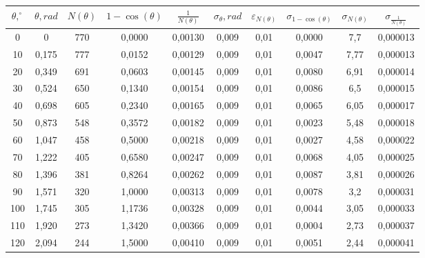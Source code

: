 \documentclass[12pt]{article}
\begin{document}
\begin{center}
    \begin{tabular}{|c|c|c|c|c|c|c|c|c|c|}
      \hline
      $\theta, ^\circ$ & $\theta, rad$ & $N(\theta)$ & $1 - \cos(\theta)$ & $\frac{1}{N(\theta)}$ & $\sigma_\theta, rad$ & $\varepsilon_{N(\theta)}$ & $\sigma_{1 - \cos(\theta)}$ & $\sigma_{N(\theta)}$ & $\sigma_{\frac{1}{N(\theta)}}$ \\
      \hline
      0 & 0 & 770 & 0,0000 & 0,00130 & 0,009 & 0,01 & 0,0000 & 7,7 & 0,000013 \\
      \hline
      10 & 0,175 & 777 & 0,0152 & 0,00129 & 0,009 & 0,01 & 0,0047 & 7,77 & 0,000013 \\
      \hline
      20 & 0,349 & 691 & 0,0603 & 0,00145 & 0,009 & 0,01 & 0,0080 & 6,91 & 0,000014 \\
      \hline
      30 & 0,524 & 650 & 0,1340 & 0,00154 & 0,009 & 0,01 & 0,0086 & 6,5 & 0,000015 \\
      \hline
      40 & 0,698 & 605 & 0,2340 & 0,00165 & 0,009 & 0,01 & 0,0065 & 6,05 & 0,000017 \\
      \hline
      50 & 0,873 & 548 & 0,3572 & 0,00182 & 0,009 & 0,01 & 0,0023 & 5,48 & 0,000018 \\
      \hline
      60 & 1,047 & 458 & 0,5000 & 0,00218 & 0,009 & 0,01 & 0,0027 & 4,58 & 0,000022 \\
      \hline
      70 & 1,222 & 405 & 0,6580 & 0,00247 & 0,009 & 0,01 & 0,0068 & 4,05 & 0,000025 \\
      \hline
      80 & 1,396 & 381 & 0,8264 & 0,00262 & 0,009 & 0,01 & 0,0087 & 3,81 & 0,000026 \\
      \hline
      90 & 1,571 & 320 & 1,0000 & 0,00313 & 0,009 & 0,01 & 0,0078 & 3,2 & 0,000031 \\
      \hline
      100 & 1,745 & 305 & 1,1736 & 0,00328 & 0,009 & 0,01 & 0,0044 & 3,05 & 0,000033 \\
      \hline
      110 & 1,920 & 273 & 1,3420 & 0,00366 & 0,009 & 0,01 & 0,0004 & 2,73 & 0,000037 \\
      \hline
      120 & 2,094 & 244 & 1,5000 & 0,00410 & 0,009 & 0,01 & 0,0051 & 2,44 & 0,000041 \\
      \hline
    \end{tabular}
\end{center}
\end{document}
